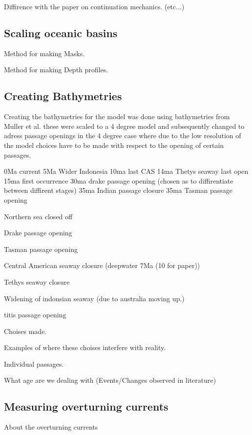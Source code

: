 \documentclass[a4paper]{article}
\begin{document}
\begin{multicols}{2}
Diffirence with the paper on continuation mechanics. (etc...)

\subsection{Scaling oceanic basins}

Method for making Masks.

Method for making Depth profiles.


\subsection{Creating Bathymetries}
Creating the bathymetries for the model was done using bathymetries from Muller et al.\cite{Muller2008Mar} these were scaled to a 4 degree model and subsequently changed to adress passage openings in the 4 degree case where due to the low resolution of the model choices have to be made with respect to the opening of certain passages.


0Ma current
5Ma Wider Indonesia
10ma last CAS
14ma Thetys seaway last open 15ma first occurrence
30ma drake passage opening (chosen as to diffirentiate between diffirent stages)
35ma Indian passage closure
35ma Tasman passage opening

Northern sea closed off


Drake passage opening \cite{Scher2006Apr}

Tasman passage opening \cite{Lawver2003Sep}

Central American seaway closure \cite{Molnar2008Jun} (deepwater 7Ma (10 for paper))\cite{Pindell1988Dec}

Tethys seaway closure \cite{Hamon2013Nov}

Widening of indonsian seaway (due to australia moving up.)


titis passage opening 

Choises made. 

Examples of where these choises interfere with reality.

Individual passages.

What age are we dealing with (Events/Changes observed in literature)




\subsection{Measuring overturning currents}
About the overturning currents


\end{multicols}
\end{document}
